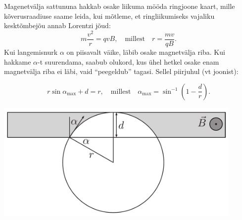 {\ifSolution
Magenetvälja sattununa hakkab osake liikuma mööda ringjoone kaart, mille kõverusraadiuse saame leida, kui mõtleme, et ringliikumiseks vajaliku kesktõmbejõu annab Lorentzi jõud:
\[m\frac{v^2}{r}=qvB, \quad \text{millest} \quad r=\frac{mv}{qB}.\]
Kui langemisnurk $\alpha$ on piisavalt väike, läbib osake magnetvälja riba. Kui hakkame $\alpha$-t
suurendama, saabub olukord, kus ühel hetkel osake enam magnetvälja riba ei läbi, vaid ``peegeldub'' tagasi. Sellel piirjuhul (vt joonist):

\[r\sin\alpha_\text{max}+d=r, \quad \text{millest} \quad \alpha_\text{max}=\sin^{-1}\left(1-\frac{d}{r}\right).\]

\begin{center}
\includegraphics[width=0.9\textwidth]{2013-lahg-02-magPeegLah.pdf}
\end{center}
\fi


}
